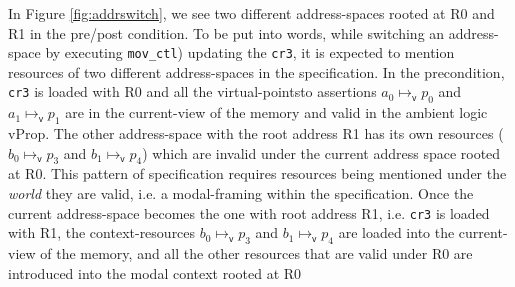 In Figure \ref{fig:addrswitch}, we see two different address-spaces rooted at R0 and R1 in the pre/post condition. To be put into words, while switching an address-space by executing \lstinline|mov_ctl|) updating the  \lstinline|cr3|, it is expected to mention resources of two different address-spaces in the specification. In the precondition,  \lstinline|cr3| is loaded with R0 and all the virtual-pointsto assertions $a_0 \mapsto_{\textsf{v}}p_0$ and $a_1 \mapsto_{\textsf{v}}p_1$ are in the current-view of the memory and valid in the ambient logic \textsf{vProp}. The other address-space with the root address R1 has its own resources ($b_0 \mapsto_{\textsf{v}}p_3$ and $b_1 \mapsto_{\textsf{v}}p_4$) which are invalid under the current address space rooted at R0. This pattern of specification requires resources being mentioned under the \textit{world} they are valid, i.e. a modal-framing within the specification. Once the current address-space becomes the one with root address R1, i.e.  \lstinline|cr3| is loaded with R1, the context-resources $b_0 \mapsto_{\textsf{v}}p_3$ and $b_1 \mapsto_{\textsf{v}}p_4$ are loaded into the current-view of the memory, and all the other resources that are valid under R0 are introduced into the modal context rooted at R0
